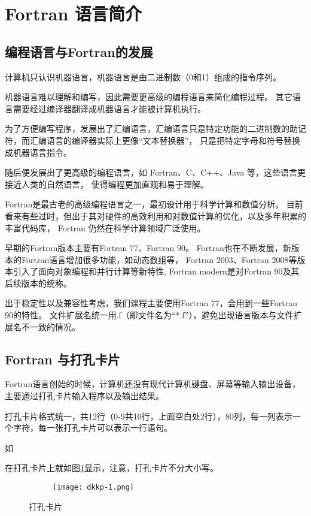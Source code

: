 \newpage
\section{Fortran 语言简介}
\subsection{编程语言与Fortran的发展}
计算机只认识机器语言，机器语言是由二进制数（0和1）组成的指令序列。

机器语言难以理解和编写，因此需要更高级的编程语言来简化编程过程。
其它语言需要经过编译器翻译成机器语言才能被计算机执行。

为了方便编写程序，发展出了汇编语言，汇编语言只是特定功能的二进制数的助记符，而汇编语言的编译器实际上更像“文本替换器”，
只是把特定字母和符号替换成机器语言指令。

随后便发展出了更高级的编程语言，如 Fortran、C、C++、Java 等，这些语言更接近人类的自然语言，
使得编程更加直观和易于理解。

Fortran是最古老的高级编程语言之一，最初设计用于科学计算和数值分析。
目前看来有些过时，但出于其对硬件的高效利用和对数值计算的优化，以及多年积累的丰富代码库，
Fortran 仍然在科学计算领域广泛使用。

早期的Fortran版本主要有Fortran 77、Fortran 90。
Fortran也在不断发展，新版本的Fortran语言增加很多功能，如动态数组等，
Fortran 2003、Fortran 2008等版本引入了面向对象编程和并行计算等新特性,
Fortran modern是对Fortran 90及其后续版本的统称。

出于稳定性以及兼容性考虑，我们课程主要使用Fortran 77，会用到一些Fortran 90的特性。
文件扩展名统一用.f（即文件名为“*.f”），避免出现语言版本与文件扩展名不一致的情况。

\subsection{Fortran 与打孔卡片}

Fortran语言创始的时候，计算机还没有现代计算机键盘、屏幕等输入输出设备，主要通过打孔卡片输入程序以及输出结果。

打孔卡片格式统一，共12行（0-9共10行，上面空白处2行），80列，每一列表示一个字符，每一张打孔卡片可以表示一行语句。

如
在打孔卡片上就如图\ref{fig:dkkp-1}显示，注意，打孔卡片不分大小写。
\begin{figure}[h]
    \centering
    \begin{subfigure}[c]{0.9\textwidth}
    \texttt{[image: dkkp-1.png]}
    \end{subfigure}    
    \caption{打孔卡片}
    \label{fig:dkkp-1}
\end{figure}

